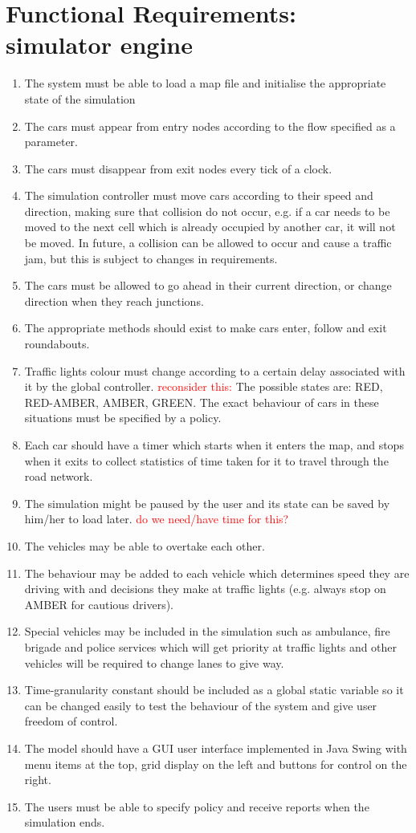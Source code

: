 \documentclass[]{article}
\begin{document}
\section*{Functional Requirements: simulator engine}
\begin{enumerate}

\item  The system must be able to load a map file and initialise the appropriate state of the simulation 

\item The cars must appear from entry nodes according to the flow specified as a parameter.
\item The cars must disappear from exit nodes every tick of a clock.
\item The simulation controller must move cars according to their speed and direction, making sure that collision do not occur, e.g. if a car needs to be moved to the next cell which is already occupied by another car, it will not be moved. In future, a collision can be allowed to occur and cause a traffic jam, but this is subject to changes in requirements.
\item The cars must be allowed to go ahead in their current direction, or change direction when they reach junctions. 
\item The appropriate methods should exist to make cars enter, follow and exit roundabouts.
\item Traffic lights colour must change according to a certain delay associated with it by the global controller. \textcolor{red}{reconsider this:} The possible states are: RED, RED-AMBER, AMBER, GREEN. The exact behaviour of cars in these situations must be specified by a policy.
\item Each car should have a timer which starts when it enters the map, and stops when it exits to collect statistics of time taken for it to travel through the road network.
\item  The simulation might be paused by the user and its state can be saved by him/her to load later. \textcolor{red}{do we need/have time for this?}
\item The vehicles may be able to overtake each other. 
\item  The behaviour may be added to each vehicle which determines speed they are driving with and decisions they make at traffic lights (e.g. always stop on AMBER for cautious drivers).
\item Special vehicles may be included in the simulation such as ambulance, fire brigade and police services which will get priority at traffic lights and other vehicles will be required to change lanes to give way. 
\item Time-granularity constant should be included as a global static variable so it can be changed easily to test the behaviour of the system and give user freedom of control. 
\item The model should have a GUI user interface implemented in Java Swing with menu items at the top, grid display on the left and buttons for control on the right. 
\item The users must be able to specify policy and receive reports when the simulation ends.  

\end{enumerate}
\end{document}
